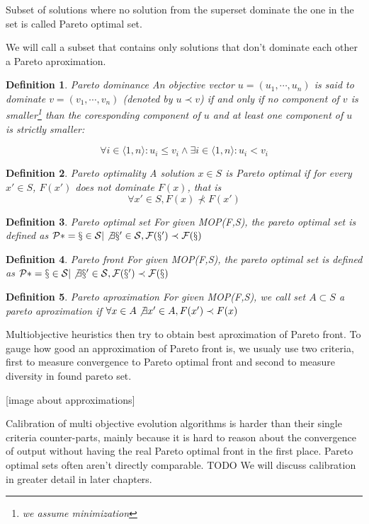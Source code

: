 \documentclass[12pt,oneside,draft]{fithesis2}
\newtheorem{defn}{Definition}
\begin{document}
Subset of solutions where no solution from the superset dominate the one in the set is called Pareto optimal set.

We will call a subset that contains only solutions that don't dominate each other a Pareto aproximation.

\begin{defn}{Pareto dominance}
An objective vector $u = (u_1,\cdots,u_n)$ is said to dominate $v = (v_1,\cdots,v_n)$ (denoted by $u \prec v$) if and only if no component of $v$ is smaller\footnote{we assume minimization} than the coresponding component of $u$ and at least one component of $u$ is strictly smaller:

$$ \forall i \in \langle 1,n\rangle: u_i \leq v_i \land \exists i \in \langle 1,n\rangle: u_i < v_i $$
\end{defn}

\begin{defn}{Pareto optimality}
A solution $x \in S$ is Pareto optimal if for every $x' \in S$, $F(x')$ does not dominate $F(x)$, that is $$ \forall x' \in S, F(x) \not \prec F(x') $$
\end{defn}

\begin{defn}{Pareto optimal set}
  For given MOP(F,S), the pareto optimal set is defined as $\cal
P* = {x \in S | \not \exists x' \in S, F(x') \prec F(x)}$
\end{defn}

\begin{defn}{Pareto front}
  For given MOP(F,S), the pareto optimal set is defined as $\cal
P* = {x \in S | \not \exists x' \in S, F(x') \prec F(x)} $
\end{defn}

\begin{defn}{Pareto aproximation}
  For given MOP(F,S), we call set $A \subset S$ a  pareto aproximation if $\forall x \in A \not \exists x' \in A, F(x') \prec F(x)$
\end{defn}

Multiobjective heuristics then try to obtain best aproximation of Pareto front. To gauge how good an approximation of Pareto front is, we usualy use two criteria, first to measure convergence to Pareto optimal front and second to measure diversity in found pareto set.

[image about approximations]

Calibration of multi objective evolution algorithms is harder than their single criteria counter-parts, mainly because it is hard to reason about the convergence of output without having the real Pareto optimal front in the first place. Pareto optimal sets often aren't directly comparable. TODO We will discuss calibration in greater detail in later chapters.
\end{document}
